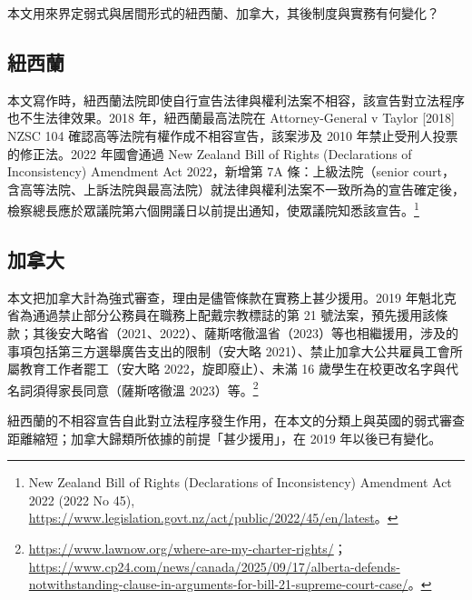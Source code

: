 
\begin{qaquestion}
本文用來界定弱式與居間形式的紐西蘭、加拿大，其後制度與實務有何變化？
\end{qaquestion}

\subsection{紐西蘭}

本文寫作時，紐西蘭法院即使自行宣告法律與權利法案不相容，該宣告對立法程序也不生法律效果。2018 年，紐西蘭最高法院在 Attorney-General v Taylor [2018] NZSC 104 確認高等法院有權作成不相容宣告，該案涉及 2010 年禁止受刑人投票的修正法。2022 年國會通過 New Zealand Bill of Rights (Declarations of Inconsistency) Amendment Act 2022，新增第 7A 條：上級法院（senior court，含高等法院、上訴法院與最高法院）就法律與權利法案不一致所為的宣告確定後，檢察總長應於眾議院第六個開議日以前提出通知，使眾議院知悉該宣告。\footnote{New Zealand Bill of Rights (Declarations of Inconsistency) Amendment Act 2022 (2022 No 45), \url{https://www.legislation.govt.nz/act/public/2022/45/en/latest}。}

\subsection{加拿大}

本文把加拿大計為強式審查，理由是儘管條款在實務上甚少援用。2019 年魁北克省為通過禁止部分公務員在職務上配戴宗教標誌的第 21 號法案，預先援用該條款；其後安大略省（2021、2022）、薩斯喀徹溫省（2023）等也相繼援用，涉及的事項包括第三方選舉廣告支出的限制（安大略 2021）、禁止加拿大公共雇員工會所屬教育工作者罷工（安大略 2022，旋即廢止）、未滿 16 歲學生在校更改名字與代名詞須得家長同意（薩斯喀徹溫 2023）等。\footnote{\url{https://www.lawnow.org/where-are-my-charter-rights/}；\url{https://www.cp24.com/news/canada/2025/09/17/alberta-defends-notwithstanding-clause-in-arguments-for-bill-21-supreme-court-case/}。}

\begin{readernote}
紐西蘭的不相容宣告自此對立法程序發生作用，在本文的分類上與英國的弱式審查距離縮短；加拿大歸類所依據的前提「甚少援用」，在 2019 年以後已有變化。
\end{readernote}
